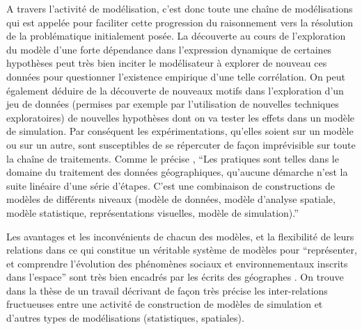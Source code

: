 A travers l'activité de modélisation, c'est donc toute une chaîne de modélisations qui est appelée pour faciliter cette progression du raisonnement vers la résolution de la problématique initialement posée. La découverte au cours de l'exploration du modèle d'une forte dépendance dans l'expression dynamique de certaines hypothèses peut très bien inciter le modélisateur à explorer de nouveau ces données pour questionner l'existence empirique d'une telle corrélation. On peut également déduire de la découverte de nouveaux motifs dans l'exploration d'un jeu de données (permises par exemple par l'utilisation de nouvelles techniques exploratoires) de nouvelles hypothèses dont on va tester les effets dans un modèle de simulation. Par conséquent les expérimentations, qu'elles soient sur un modèle ou sur un autre, sont susceptibles de se répercuter de façon imprévisible sur toute la chaîne de traitements. Comme le précise \textcite[63]{Mathian2014}, \enquote{Les pratiques sont telles dans le domaine du traitement des données géographiques, qu'aucune démarche n'est la suite linéaire d'une série d'étapes. C'est une combinaison de constructions de modèles de différents niveaux (modèle de données, modèle d'analyse spatiale, modèle statistique, représentations visuelles, modèle de simulation).}

Les avantages et les inconvénients de chacun des modèles, et la flexibilité de leurs relations dans ce qui constitue un véritable système de modèles pour \enquote{représenter, et comprendre l'évolution des phénomènes sociaux et environnementaux inscrits dans l'espace} sont très bien encadrés par les écrits des géographes \textcites{Sanders2000, Mathian2014}. On trouve dans la thèse de \textcite{Cottineau2014a, Cottineau2014b} un travail décrivant de façon très précise les inter-relations fructueuses entre une activité de construction de modèles de simulation et d'autres types de modélisations (statistiques, spatiales).



